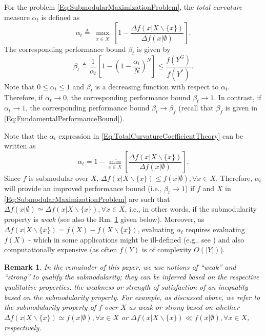 \documentclass[letterpaper, 10 pt, conference]{ieeeconf}
\newtheorem{remark}{Remark}
\begin{document}
{For the problem \eqref{Eq:SubmodularMaximizationProblem}, the \emph{total curvature} measure $\alpha_t$ is defined as 
\begin{equation}\label{Eq:TotalCurvatureCoefficientTheory}
    \alpha_t \triangleq \max_{\substack{x \in X} }\left[1 - \frac{\Delta f(x \vert X \backslash \{x\})}{\Delta f(x \vert \emptyset)}\right].
\end{equation}
The corresponding performance bound $\beta_t$ is given by
\begin{equation}\label{Eq:TotalCurvatureBoundTheory}
    \beta_t \triangleq \frac{1}{\alpha_t} \left[ 1 - \left( 1 -\frac{\alpha_t}{N} \right)^N \right] \leq \frac{f(Y^G)}{f(Y^*)}.
\end{equation}
Note that $0 \leq \alpha_t \leq 1$ and $\beta_t$ is a decreasing function with respect to $\alpha_t$. Therefore, if $\alpha_t\rightarrow 0$, the corresponding performance bound $\beta_t\rightarrow 1$. In contrast, if $\alpha_t\rightarrow 1$, the corresponding performance bound $\beta_t\rightarrow\beta_f$ (recall that $\beta_f$ is given in \eqref{Eq:FundamentalPerformanceBound}).


Note that the $\alpha_t$ expression in \eqref{Eq:TotalCurvatureCoefficientTheory} can be written as
$$ 
    \alpha_t = 1 - \min_{x \in X}\left[\frac{\Delta f(x \vert X \backslash \{x\})}{\Delta f(x \vert \emptyset)}\right].
$$
Since $f$ is submodular over $X$, $\Delta f(x \vert X \backslash \{x\}) \leq f(x \vert \emptyset), \forall x \in X$. Therefore, $\alpha_t$ will provide an improved performance bound (i.e., $\beta_t \rightarrow 1$) if $f$ and $X$ in \eqref{Eq:SubmodularMaximizationProblem} are such that $\Delta f(x \vert \emptyset) \simeq \Delta f(x \vert X \backslash \{x\}), \forall x \in X$, i.e., in other words, if the submodularity property is \emph{weak} (see also the Rm. \ref{Rm:SubmodularityStrength} given below). Moreover, as $\Delta f(x \vert X \backslash \{x\}) = f(X) - f(X \backslash \{x\})$, evaluating $\alpha_t$ requires evaluating $f(X)$ - which in some applications might be ill-defined (e.g., see \cite{Sun2020}) and also computationally expensive (as often $f(Y)$ is of complexity $O(\vert Y \vert)$). 

\begin{remark}\label{Rm:SubmodularityStrength}
In the remainder of this paper, we use notions of ``weak'' and ``strong'' to qualify the submodularity; they can be inferred based on the respective qualitative properties: the weakness or strength of satisfaction of an inequality based on the submodularity property. For example, as discussed above, we refer to the submodularity property of $f$ over $X$ as weak or strong based on whether $\Delta f(x \vert X \backslash \{x\}) \simeq f(x \vert \emptyset), \forall x \in X$ or 
$\Delta f(x \vert X \backslash \{x\}) \ll f(x \vert \emptyset), \forall x \in X$, respectively. 
\end{remark}


}
\end{document}
